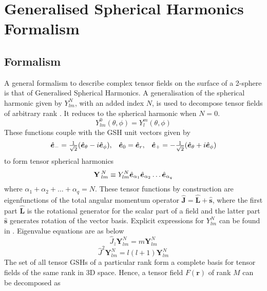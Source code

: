 \chapter{Generalised Spherical Harmonics Formalism}\label{app_gsh}

\section{Formalism}
A general formalism to describe complex tensor fields on the surface of a 2-sphere is that of Generalised Spherical Harmonics. A generalisation of the spherical harmonic given by $Y_{lm}^N$, with an added index $N$, is used to decompose tensor fields of arbitrary rank \cite{phinney_gsh}. It reduces to the spherical harmonic when $N=0$.
\begin{equation}
Y_{lm}^0(\theta,\phi) = Y_l^m(\theta,\phi)
\end{equation}
These functions couple with the GSH unit vectors given by
\begin{equation}
\begin{array}{ccc} \hat{\bm{e}}_{-} = \frac{1}{\sqrt{2}}(\hat{\bm{e}}_{\theta} - i \hat{\bm{e}}_{\phi}), & \hat{\bm{e}}_{0} = \hat{\bm{e}}_{r}, & \hat{\bm{e}}_{+} = -\frac{1}{\sqrt{2}}(\hat{\bm{e}}_{\theta} + i \hat{\bm{e}}_{\phi}) \\ \end{array}
\end{equation}
to form tensor spherical harmonics
\begin{equation}
\mathbf{Y}\,_{lm}^{N} \equiv Y_{lm}^{N} \hat{\bm{e}}_{\alpha_1}\hat{\bm{e}}_{\alpha_2} \ldots \hat{\bm{e}}_{\alpha_q}
\end{equation}
where $\alpha_1 + \alpha_2 +\ldots + \alpha_q = N$. These tensor functions by construction are eigenfunctions of the total angular momentum operator $\hat{\mathbf{J}} = \hat{\mathbf{L}} + \hat{\mathbf{s}}$, where the first part $\hat{\mathbf{L}}$ is the rotational generator for the scalar part of a field and the latter part $\hat{\mathbf{s}}$ generates rotation of the vector basis. Explicit expressions for $Y_{lm}^{N}$ can be found in \cite{DT98}. Eigenvalue equations are as below
\begin{equation}
\hat{J}_{z} \mathbf{Y}_{lm}^N = m\mathbf{Y}_{lm}^N
\end{equation}
\begin{equation}
\hat{J}^2 \mathbf{Y}_{lm}^N = l(l+1) \mathbf{Y}_{lm}^N
\end{equation}
The set of all tensor GSHs of a particular rank form a complete basis for tensor fields of the same rank in 3D space. Hence, a tensor field $F(\mathbf{r})$ of rank $M$ can be decomposed as 

